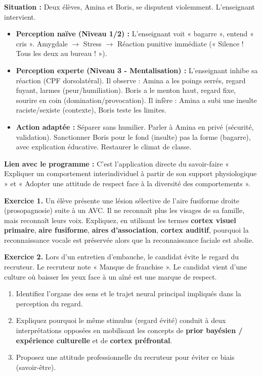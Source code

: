 \documentclass[11pt]{article}
\begin{document}
\begin{exemplebox}
\textbf{Situation :} Deux élèves, Amina et Boris, se disputent violemment. L'enseignant intervient.
\begin{itemize}
    \item \textbf{Perception naïve (Niveau 1/2) :} L'enseignant voit « bagarre », entend « cris ». Amygdale $\to$ Stress $\to$ Réaction punitive immédiate (« Silence ! Tous les deux au bureau ! »).
    \item \textbf{Perception experte (Niveau 3 - Mentalisation) :} L'enseignant inhibe sa réaction (CPF dorsolatéral). Il observe : Amina a les poings serrés, regard fuyant, larmes (peur/humiliation). Boris a le menton haut, regard fixe, sourire en coin (domination/provocation). Il infère : Amina a subi une insulte raciste/sexiste (contexte), Boris teste les limites.
    \item \textbf{Action adaptée :} Séparer sans humilier. Parler à Amina en privé (sécurité, validation). Sanctionner Boris pour le fond (insulte) pas la forme (bagarre), avec explication éducative. Restaurer le climat de classe.
\end{itemize}
\textbf{Lien avec le programme :} C'est l'application directe du savoir-faire « Expliquer un comportement interindividuel à partir de son support physiologique » et « Adopter une attitude de respect face à la diversité des comportements ».
\end{exemplebox}

\begin{exercice}
\textbf{Exercice 1.} Un élève présente une lésion sélective de l'aire fusiforme droite (prosopagnosie) suite à un AVC. Il ne reconnaît plus les visages de sa famille, mais reconnaît leurs voix. Expliquez, en utilisant les termes \textbf{cortex visuel primaire}, \textbf{aire fusiforme}, \textbf{aires d'association}, \textbf{cortex auditif}, pourquoi la reconnaissance vocale est préservée alors que la reconnaissance faciale est abolie.

\textbf{Exercice 2.} Lors d'un entretien d'embauche, le candidat évite le regard du recruteur. Le recruteur note « Manque de franchise ». Le candidat vient d'une culture où baisser les yeux face à un aîné est une marque de respect.
\begin{enumerate}
    \item Identifiez l'organe des sens et le trajet neural principal impliqués dans la perception du regard.
    \item Expliquez pourquoi le même stimulus (regard évité) conduit à deux interprétations opposées en mobilisant les concepts de \textbf{prior bayésien / expérience culturelle} et de \textbf{cortex préfrontal}.
    \item Proposez une attitude professionnelle du recruteur pour éviter ce biais (savoir-être).
\end{enumerate}
\end{exercice}
\end{document}
